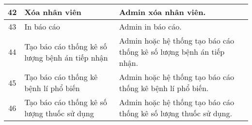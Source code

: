 \begin{longtable}{|c|p{4cm}|p{8cm}|}
  \hline
  42 & Xóa nhân viên & Admin xóa nhân viên. \\
  \hline
  43 & In báo cáo & Admin in báo cáo. \\
  \hline
  44 & Tạo báo cáo thống kê số lượng bệnh án tiếp nhận & Admin hoặc hệ thống tạo báo cáo thống kê số lượng bệnh án tiếp nhận. \\
  \hline
  45 & Tạo báo cáo thống kê bệnh lí phổ biến & Admin hoặc hệ thống tạo báo cáo thống kê bệnh lí phổ biến. \\
  \hline
  46 & Tạo báo cáo thống kê số lượng thuốc sử dụng & Admin hoặc hệ thống tạo báo cáo thống kê số lượng thuốc sử dụng. \\
  \hline
\end{longtable}